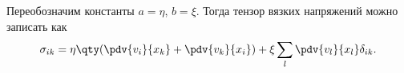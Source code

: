 Переобозначим константы $a=\eta$, $b=\xi$. Тогда тензор вязких напряжений можно записать как
\begin{equation}
    \sigma_{ik} = \eta \qty(\pdv{v_i}{x_k}+\pdv{v_k}{x_i})+\xi \sum\limits_l \pdv{v_l}{x_l} \delta_{ik}.
\end{equation}

